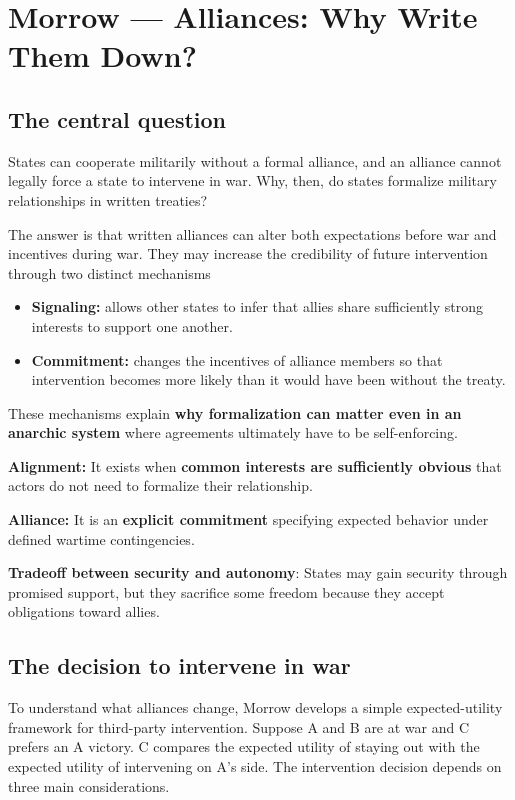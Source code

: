 \clearpage
\section{Morrow --- Alliances: Why Write Them Down?}

\subsection{The central question}

States can cooperate militarily without a formal alliance, and an alliance cannot legally force a state to intervene in war. Why, then, do states formalize military relationships in written treaties?

The answer is that written alliances can alter both expectations before war and incentives during war. They may increase the credibility of future intervention through two distinct mechanisms
\begin{itemize}
    \item \textbf{Signaling:} allows other states to infer that allies share sufficiently strong interests to support one another.
    \item \textbf{Commitment:} changes the incentives of alliance members so that intervention becomes more likely than it would have been without the treaty. 
\end{itemize}

These mechanisms explain \textbf{why formalization can matter even in an anarchic system} where agreements ultimately have to be self-enforcing.

\textbf{Alignment:} It exists when \textbf{common interests are sufficiently obvious} that actors do not need to formalize their relationship.

\textbf{Alliance:} It is an \textbf{explicit commitment} specifying expected behavior under defined wartime contingencies.

\textbf{Tradeoff between security and autonomy}: States may gain security through promised support, but they sacrifice some freedom because they accept obligations toward allies.

\subsection{The decision to intervene in war}

To understand what alliances change, Morrow develops a simple expected-utility framework for third-party intervention. Suppose A and B are at war and C prefers an A victory. C compares the expected utility of staying out with the expected utility of intervening on A's side. The intervention decision depends on three main considerations.

